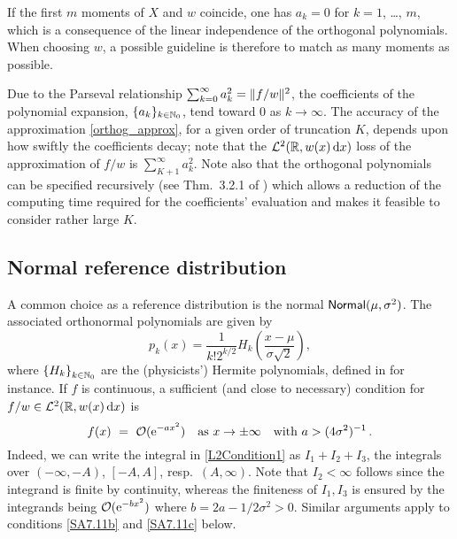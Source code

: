 \begin{remark}\label{Rem:27.10a}
If the first $m$ moments of $X$ and $w$ coincide, one has $a_k=0$ for $k=1$, \ldots, $m$, which is a consequence of the linear independence of the orthogonal polynomials.
When choosing $w$, a possible guideline is therefore to match as many moments as possible.
\remQED
\end{remark}

Due to the Parseval relationship $\sum_{k=0}^\infty a_k^2=\lVert f/w\rVert^2$, the coefficients of the polynomial expansion, $\{a_k\}_{k\in\mathbb{N}_0}$, tend toward $0$ as $k \to \infty$.
The accuracy of the approximation \eqref{orthog_approx}, for a given order of truncation $K$, depends upon how swiftly the coefficients decay; note that the $\mathcal{L}^2(\mathbb{R}, w(x) \mathop{}\!\mathrm{d} x)$ loss of the approximation of $f/w$ is $\sum_{K+1}^{\infty}a_k^2$.
Note also that the orthogonal polynomials can be specified recursively
(see Thm.~3.2.1 of \cite{Szegoe1939}) which allows a reduction of the computing time required for the coefficients' evaluation
and makes it feasible to consider rather large $K$.


\subsection{Normal reference distribution}\label{SS:NormalNu}
A common choice as a reference distribution is the normal $\mathsf{Normal}(\mu,\sigma^{2})$. The associated orthonormal polynomials are given by
\begin{equation}\label{eq:NormalDistributionOrthogonalPolynomial}
p_{k}(x)=\frac{1}{k!2^{k/2}}H_{k}\left(\frac{x-\mu}{\sigma\sqrt{2}}\right),
\end{equation}
where $\left\{H_{k}\right\}_{k\in\mathbb{N}_0}$ are the (physicists') Hermite polynomials, defined in \cite{Szegoe1939} for instance.
If $f$ is continuous, a sufficient (and close to necessary) condition for $f/w\in\mathcal{L}^2(\mathbb{R}, w(x) \mathop{}\!\mathrm{d} x)$ is
\begin{equation}\label{SA7.11a}
f(x)\ =\ {\mathcal{O}}(\mathrm{e}^{-ax^2})\quad\text{as }x\to\pm\infty\quad\text{with } a>(4\sigma^2)^{-1}\,.
\end{equation}
Indeed, we can  write the integral in \eqref{L2Condition1} as $I_1+I_2+I_3$, the integrals over
$(-\infty,-A)$, $[-A,A]$, resp.\ $(A,\infty)$. Note that $I_2<\infty$  follows since the integrand
is finite by continuity, whereas the finiteness of $I_1,I_3$ is ensured by the integrands
being ${\mathcal{O}}(\mathrm{e}^{-bx^2})$ where $b=2a-1/2\sigma^2>0$. Similar arguments apply to
conditions \eqref{SA7.11b} and \eqref{SA7.11c} below.

